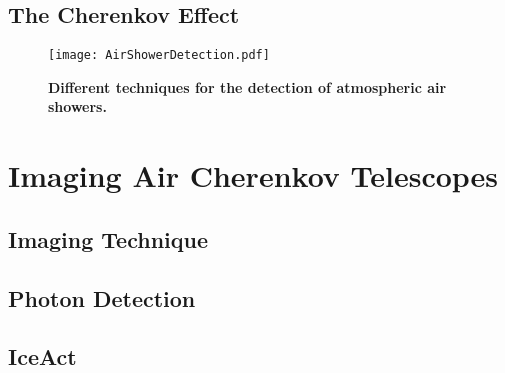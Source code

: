 \subsection{The Cherenkov Effect}

\begin{figure}[h]
	\texttt{[image: AirShowerDetection.pdf]}
	\caption[Different techniques for air shower detection]{\textbf{Different techniques for the detection of atmospheric air showers. \cite{airshowers:schroeder}} }	
\end{figure}

\section{Imaging Air Cherenkov Telescopes}

\subsection{Imaging Technique}

\subsection{Photon Detection}

\subsection{IceAct}